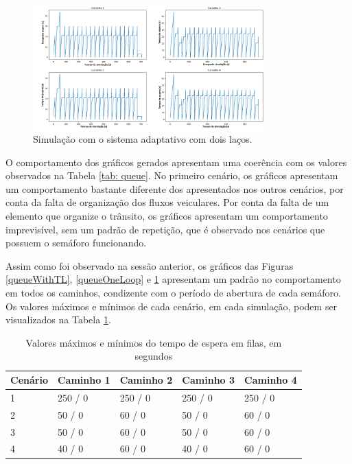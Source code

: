 \begin{figure}[H]
    \begin{center}
    \includegraphics[width=0.8\textwidth]{figuras/Queue_Duration_With_Two_Loop.PNG}
    \end{center}
    \caption[Duração das filas, cenário 4]{Simulação com o sistema adaptativo com dois laços.}
    \label{queueTwoLoop}
\end{figure}

O comportamento dos gráficos gerados apresentam uma coerência com os valores observados na Tabela \ref{tab: queue}. No primeiro cenário, os gráficos apresentam um comportamento bastante diferente dos apresentados nos outros cenários, por conta da falta de organização dos fluxos veiculares. Por conta da falta de um elemento que organize o trânsito, os gráficos apresentam um comportamento imprevisível, sem um padrão de repetição, que é observado nos cenários que possuem o semáforo funcionando.

Assim como foi observado na sessão anterior, os gráficos das Figuras \ref{queueWithTL}, \ref{queueOneLoop} e \ref{queueTwoLoop} apresentam um padrão no comportamento em todos os caminhos, condizente com o período de abertura de cada semáforo. Os valores máximos e mínimos de cada cenário, em cada simulação, podem ser visualizados na Tabela \ref{tab: queueMinMax}.

\begin{table}[H]
\centering
\caption{Valores máximos e mínimos do tempo de espera em filas, em segundos}
\label{tab: queueMinMax}
\begin{tabular}{@{}lllll@{}}
\toprule
Cenário & Caminho 1 & Caminho 2 & Caminho 3 & Caminho 4 \\ \midrule
1 & 250 / 0 & 250 / 0 & 250 / 0 & 250 / 0 \\
2 & 50 / 0 & 60 / 0 & 50 / 0 & 60 / 0 \\
3 &	50 / 0 & 60 / 0 & 50 / 0 & 60 / 0 \\
4 & 40 / 0 & 60 / 0 & 40 / 0 & 60 / 0 \\
\bottomrule
\end{tabular}
\end{table}

